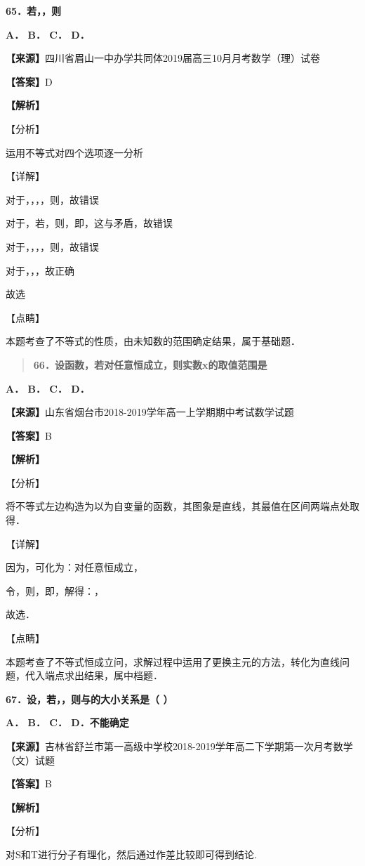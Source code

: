 \textbf{65．若，，则　　}

\textbf{A． B． C． D．}

\textbf{【来源】}四川省眉山一中办学共同体2019届高三10月月考数学（理）试卷

\textbf{【答案】}D

\textbf{【解析】}

【分析】

运用不等式对四个选项逐一分析

【详解】

对于，，，，则，故错误

对于，若，则，即，这与矛盾，故错误

对于，，，，则，故错误

对于，，，故正确

故选

【点睛】

本题考查了不等式的性质，由未知数的范围确定结果，属于基础题．

\begin{quote}
\textbf{66．设函数，若对任意恒成立，则实数x的取值范围是　　}
\end{quote}

\textbf{A． B． C． D．}

\textbf{【来源】}山东省烟台市2018-2019学年高一上学期期中考试数学试题

\textbf{【答案】}B

\textbf{【解析】}

【分析】

将不等式左边构造为以为自变量的函数，其图象是直线，其最值在区间两端点处取得．

【详解】

因为，可化为：对任意恒成立，

令，则，即，解得：，

故选．

【点睛】

本题考查了不等式恒成立问，求解过程中运用了更换主元的方法，转化为直线问题，代入端点求出结果，属中档题．

\textbf{67．设，若，，则与的大小关系是（ ）}

\textbf{A． B． C． D．不能确定}

\textbf{【来源】}吉林省舒兰市第一高级中学校2018-2019学年高二下学期第一次月考数学（文）试题

\textbf{【答案】}B

\textbf{【解析】}

【分析】

对S和T进行分子有理化，然后通过作差比较即可得到结论.

